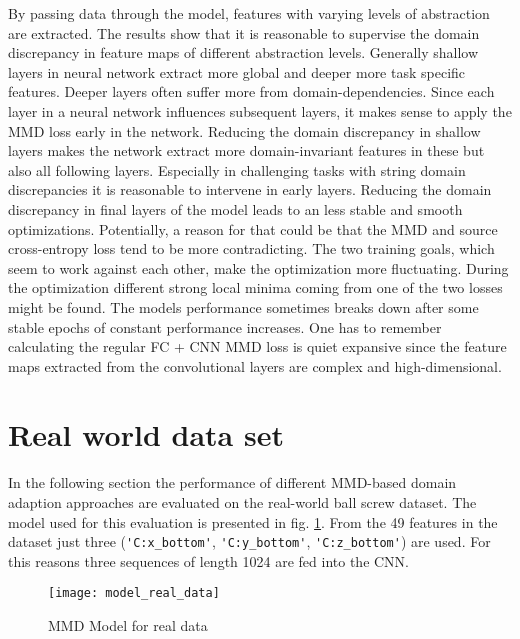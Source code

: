 By passing data through the model, features with varying levels of abstraction are extracted. The results show that it is reasonable to supervise the domain discrepancy in feature maps of different abstraction levels. Generally shallow layers in neural network extract more global and deeper more task specific features. Deeper layers often suffer more from domain-dependencies. Since each layer in a neural network influences subsequent layers, it makes sense to apply the MMD loss early in the network. Reducing the domain discrepancy in shallow layers makes the network extract more domain-invariant features in these but also all following layers. Especially in challenging tasks with string domain discrepancies it is reasonable to intervene in early layers. Reducing the domain discrepancy in final layers of the model leads to an less stable and smooth optimizations. Potentially, a reason for that could be that the MMD and source cross-entropy loss tend to be more contradicting. The two training goals, which seem to work against each other, make the optimization more fluctuating. During the optimization different strong local minima coming from one of the two losses might be found. The models performance sometimes breaks down after some stable epochs of constant performance increases. One has to remember calculating the regular FC + CNN MMD loss is quiet expansive since the feature maps extracted from the convolutional layers are complex and high-dimensional.



\section{Real world data set}
In the following section the performance of different MMD-based domain adaption approaches are evaluated on the real-world ball screw dataset. The model used for this evaluation is presented in fig. \ref{fig:model_real_data}. From the 49 features in the dataset just three (\verb|'C:x_bottom'|, \verb|'C:y_bottom'|, \verb|'C:z_bottom'|) are used. For this reasons three sequences of length 1024 are fed into the CNN.

\begin{figure}[H]
  \centering
  \texttt{[image: model\_real\_data]}
  \caption {MMD Model for real data} \label{fig:model_real_data}
\end{figure}


